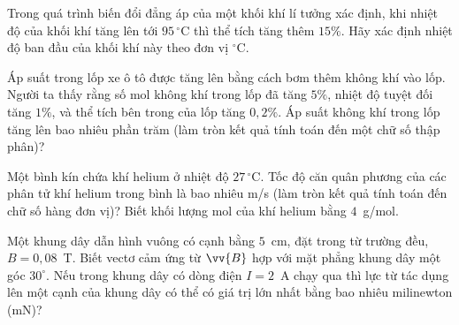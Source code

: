 	\begin{ex}%
		Trong quá trình biến đổi đẳng áp của một khối khí lí tưởng xác định, khi nhiệt độ của khối khí tăng lên tới $95\,^\circ\text{C}$ thì thể tích tăng thêm $15\%$. Hãy xác định nhiệt độ ban đầu của khối khí này theo đơn vị $^\circ\text{C}$.
		\par
	\end{ex}

	\begin{ex}%
		Áp suất trong lốp xe ô tô được tăng lên bằng cách bơm thêm không khí vào lốp. Người ta thấy rằng số mol không khí trong lốp đã tăng $5\%$, nhiệt độ tuyệt đối tăng $1\%$, và thể tích bên trong của lốp tăng $0{,}2\%$. Áp suất không khí trong lốp tăng lên bao nhiêu phần trăm (làm tròn kết quả tính toán đến một chữ số thập phân)?
		\par
	\end{ex}

	\begin{ex}%
		Một bình kín chứa khí helium ở nhiệt độ $27\,^\circ\text{C}$. Tốc độ căn quân phương của các phân tử khí helium trong bình là bao nhiêu m/s (làm tròn kết quả tính toán đến chữ số hàng đơn vị)? Biết khối lượng mol của khí helium bằng $4$~g/mol.
		\par
	\end{ex}

	\begin{ex}%
		Một khung dây dẫn hình vuông có cạnh bằng $5$~cm, đặt trong từ trường đều, $B=0{,}08$~T. Biết vectơ cảm ứng từ $\vv{B}$ hợp với mặt phẳng khung dây một góc $30^\circ$. Nếu trong khung dây có dòng điện $I=2$~A chạy qua thì lực từ tác dụng lên một cạnh của khung dây có thể có giá trị lớn nhất bằng bao nhiêu milinewton (mN)?
		\par
	\end{ex}

